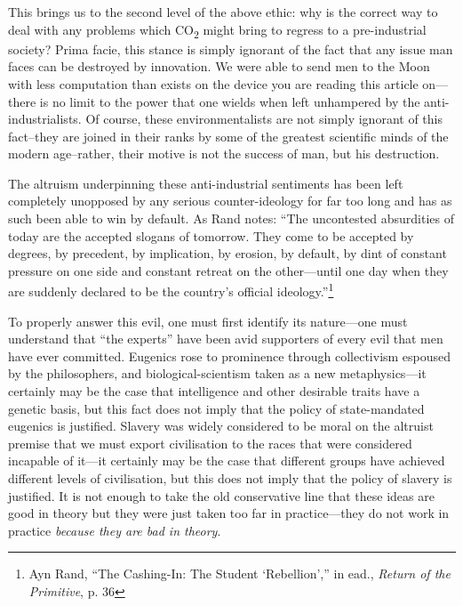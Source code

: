 \documentclass[11pt]{article}
\begin{document}
This brings us to the second level of the above ethic: why is the correct way to deal with any problems which CO\textsubscript{2} might bring to regress to a pre-industrial society? Prima facie, this stance is simply ignorant of the fact that any issue man faces can be destroyed by innovation. We were able to send men to the Moon with less computation than exists on the device you are reading this article on---there is no limit to the power that one wields when left unhampered by the anti-industrialists. Of course, these environmentalists are not simply ignorant of this fact--they are joined in their ranks by some of the greatest scientific minds of the modern age--rather, their motive is not the success of man, but his destruction.

The altruism underpinning these anti-industrial sentiments has been left completely unopposed by any serious counter-ideology for far too long and has as such been able to win by default. As Rand notes: ``The uncontested absurdities of today are the accepted slogans of tomorrow. They come to be accepted by degrees, by precedent, by implication, by erosion, by default, by dint of constant pressure on one side and constant retreat on the other---until one day when they are suddenly declared to be the country's official ideology.''\footnote{Ayn Rand, ``The Cashing-In: The Student `Rebellion','' in ead., \emph{Return of the Primitive}, p. 36}

To properly answer this evil, one must first identify its nature---one must understand that ``the experts'' have been avid supporters of every evil that men have ever committed. Eugenics rose to prominence through collectivism espoused by the philosophers, and biological-scientism taken as a new metaphysics---it certainly may be the case that intelligence and other desirable traits have a genetic basis, but this fact does not imply that the policy of state-mandated eugenics is justified. Slavery was widely considered to be moral on the altruist premise that we must export civilisation to the races that were considered incapable of it---it certainly may be the case that different groups have achieved different levels of civilisation, but this does not imply that the policy of slavery is justified. It is not enough to take the old conservative line that these ideas are good in theory but they were just taken too far in practice---they do not work in practice \emph{because they are bad in theory}.
\end{document}
